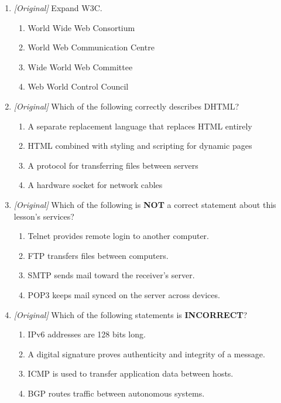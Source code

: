 \begin{enumerate}[label=\textbf{Q\arabic*.}, leftmargin=*]
\begin{enumerate}[label=\Alph*.]
    \item sender name and receiver name
    \item protocol name and address
  \end{enumerate}
\item \textit{[Original]} Expand W3C.
  \begin{enumerate}[label=\Alph*.]
    \item World Wide Web Consortium
    \item World Web Communication Centre
    \item Wide World Web Committee
    \item Web World Control Council
  \end{enumerate}
\item \textit{[Original]} Which of the following correctly describes DHTML?
  \begin{enumerate}[label=\Alph*.]
    \item A separate replacement language that replaces HTML entirely
    \item HTML combined with styling and scripting for dynamic pages
    \item A protocol for transferring files between servers
    \item A hardware socket for network cables
  \end{enumerate}
\item \textit{[Original]} Which of the following is \textbf{NOT} a correct
  statement about this lesson's services?
  \begin{enumerate}[label=\Alph*.]
    \item Telnet provides remote login to another computer.
    \item FTP transfers files between computers.
    \item SMTP sends mail toward the receiver's server.
    \item POP3 keeps mail synced on the server across devices.
  \end{enumerate}
\item \textit{[Original]} Which of the following statements is
  \textbf{INCORRECT}?
  \begin{enumerate}[label=\Alph*.]
    \item IPv6 addresses are 128 bits long.
    \item A digital signature proves authenticity and integrity of a message.
    \item ICMP is used to transfer application data between hosts.
    \item BGP routes traffic between autonomous systems.

\end{enumerate}
\end{enumerate}
